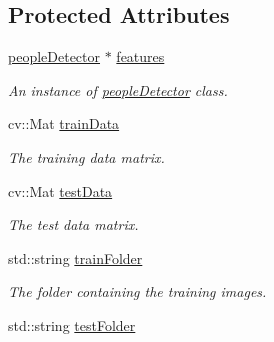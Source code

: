 \subsection*{Protected Attributes}
\begin{DoxyCompactItemize}
\item 
\hypertarget{classclassifyImages_a6b54c7d82e1d89ae7994a88ce0c6889b}{
\hyperlink{classpeopleDetector}{peopleDetector} $\ast$ \hyperlink{classclassifyImages_a6b54c7d82e1d89ae7994a88ce0c6889b}{features}}
\label{classclassifyImages_a6b54c7d82e1d89ae7994a88ce0c6889b}

\begin{DoxyCompactList}\small\item\em An instance of {\ttfamily \hyperlink{classpeopleDetector}{peopleDetector}} class. \item\end{DoxyCompactList}\item 
\hypertarget{classclassifyImages_a0aa55d034e03263d29eb56b0df841f45}{
cv::Mat \hyperlink{classclassifyImages_a0aa55d034e03263d29eb56b0df841f45}{trainData}}
\label{classclassifyImages_a0aa55d034e03263d29eb56b0df841f45}

\begin{DoxyCompactList}\small\item\em The training data matrix. \item\end{DoxyCompactList}\item 
\hypertarget{classclassifyImages_ad90d3c1df694b6d4c26520d916b82141}{
cv::Mat \hyperlink{classclassifyImages_ad90d3c1df694b6d4c26520d916b82141}{testData}}
\label{classclassifyImages_ad90d3c1df694b6d4c26520d916b82141}

\begin{DoxyCompactList}\small\item\em The test data matrix. \item\end{DoxyCompactList}\item 
\hypertarget{classclassifyImages_aa132c49ad63d508ac2a4c0503e22f089}{
std::string \hyperlink{classclassifyImages_aa132c49ad63d508ac2a4c0503e22f089}{trainFolder}}
\label{classclassifyImages_aa132c49ad63d508ac2a4c0503e22f089}

\begin{DoxyCompactList}\small\item\em The folder containing the training images. \item\end{DoxyCompactList}\item 
\hypertarget{classclassifyImages_a7373134549cfc434db469f7e07e10f85}{
std::string \hyperlink{classclassifyImages_a7373134549cfc434db469f7e07e10f85}{testFolder}}
\label{classclassifyImages_a7373134549cfc434db469f7e07e10f85}


\end{DoxyCompactItemize}
